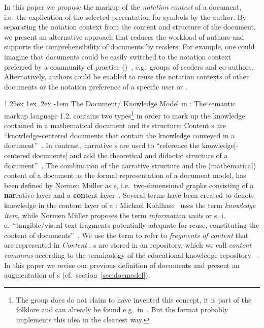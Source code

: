 \documentclass[pdftex,bibtotocnumbered,idxtotoc,11pt]{scrartcl}
\makeatletter
\renewcommand\paragraph{\@startsection{paragraph}{4}{\z@}%
{1.25ex \@plus1ex \@minus.2ex}%
{-1em}%
{\setlength{\parfillskip}{\z@ \@plus 1fil}%
\raggedsection\normalfont\sectfont\nobreak
\size@paragraph\nobreak}}
\makeatother
\begin{document}
In this paper we propose the markup of the {\emph{notation context}} of a document, i.e.\
the explication of the selected presentation for symbols by the author. By separating the
notation context from the content and structure of the document, we present an alternative
approach that reduces the workload of authors and supports the comprehensibility of
documents by readers: For example, one could imagine that documents could be easily
switched to the notation context preferred by a community of practice
({\cop})~\cite{Wen05}, e.g.\ groups of readers and co-authors. Alternatively, authors
could be enabled to reuse the notation contexts of other documents or the notation
preference of a specific user or
{\cop}.%

\paragraph{The Document/ Knowledge Model in {\omdoc}:}
The semantic markup language {\omdoc}1.2. contains two {\omdoc} types\footnote{The
  {\omdoc} group does do not claim to have invented this concept, it is part of the {\xml}
  folklore and can already be found e.g.\ in~\cite{vd04:nc}. But the {\omdoc} format
  probably implements this idea in the cleanest way.} in order to mark up the knowledge
contained in a mathematical document and its structure: Content {\omdoc}s are
``knowledge-centered documents that contain the knowledge conveyed in a
document''~\cite{Kohlhase:omdoc1.2}. In contrast, narrative {\omdoc}s are used to
``reference the knowledge[-centered documents] and add the theoretical and didactic
structure of a document''~\cite{Kohlhase:omdoc1.2}. The combination of the narrative
structure and the (mathematical) content of a document as the formal representation of a
document model, has been defined by Normen M\"uller as {\narcon}s, i.e.\ two-dimensional
graphs consisting of a \textbf{nar}rative layer and a \textbf{con}tent
layer~\cite{NRM:lwa06}. Several terms have been created to denote knowledge in the content
layer of a {\narcon}: Michael Kohlhase~\cite{Kohlhase:omdoc1.2} uses the term
\textit{knowledge item}, while Normen M\"uller proposes the term {\emph{information
    units}} or {\infom}s, i.\,e.\ ``tangible/visual text fragments potentially adequate
for reuse, constituting the content of documents''~\cite{NRM:lwa06}. We use the term
{\infom} to refer to {\emph{fragments of content}} that are represented in
{\emph{Content}} {\omdoc}.  {\infom}s are stored in an {\omdoc} repository, which we call
{\emph{content commons}} according to the terminology of the educational knowledge
repository {\connexions}~\cite{cnxweb}. In this paper we revise our previous definition of
documents and present an augmentation of {\narcon}s (cf.~section~\ref{sec:docmodel}).
\end{document}
